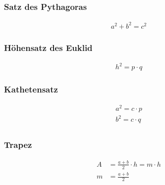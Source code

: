 \subsubsection{Satz des Pythagoras}
\begin{align*}
    a^2+b^2=c^2
\end{align*}

\subsubsection{Höhensatz des Euklid}
\begin{align*}
    h^2=p \cdot q
\end{align*}




\subsubsection{Kathetensatz}
\begin{align*}
    a^2=c \cdot p \\
    b^2=c \cdot q \\
\end{align*}

\subsubsection{Trapez}
\begin{align*}
    A &= \frac{a+b}{2} \cdot h = m \cdot h \\
    m &= \frac{a+b}{2}
\end{align*}

